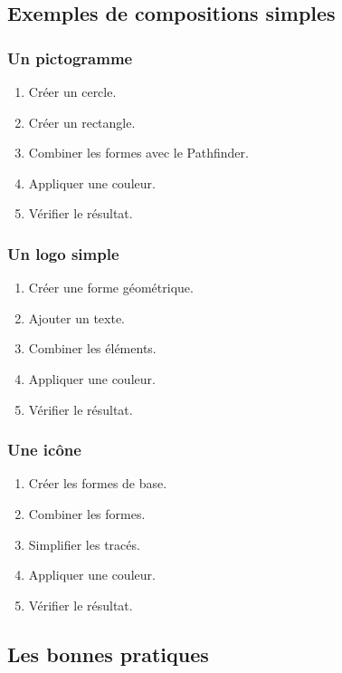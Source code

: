 \subsection{Exemples de compositions simples}

\subsubsection{Un pictogramme}

\begin{enumerate}
    \item Créer un cercle.
    \item Créer un rectangle.
    \item Combiner les formes avec le Pathfinder.
    \item Appliquer une couleur.
    \item Vérifier le résultat.
\end{enumerate}

\subsubsection{Un logo simple}

\begin{enumerate}
    \item Créer une forme géométrique.
    \item Ajouter un texte.
    \item Combiner les éléments.
    \item Appliquer une couleur.
    \item Vérifier le résultat.
\end{enumerate}

\subsubsection{Une icône}

\begin{enumerate}
    \item Créer les formes de base.
    \item Combiner les formes.
    \item Simplifier les tracés.
    \item Appliquer une couleur.
    \item Vérifier le résultat.
\end{enumerate}

\subsection{Les bonnes pratiques}

